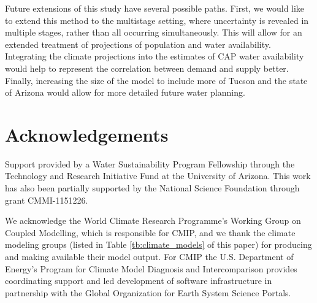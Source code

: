 \documentclass[opre,nonblindrev]{informs3} %
\begin{document}
Future extensions of this study have several possible paths.
First, we would like to extend this method to the multistage setting, where uncertainty is revealed in multiple stages, rather than all occurring simultaneously.
This will allow for an extended treatment of projections of population and water availability.
Integrating the climate projections into the estimates of CAP water availability would help to represent the correlation between demand and supply better.
Finally, increasing the size of the model to include more of Tucson and the state of Arizona would allow for more detailed future water planning.




%

\section*{Acknowledgements}
Support provided by a Water Sustainability Program Fellowship through the Technology and Research Initiative Fund at the University of Arizona.
This work has also been partially supported by the National Science Foundation through grant CMMI-1151226.

We acknowledge the World Climate Research Programme's Working Group on Coupled Modelling, which is responsible for CMIP, and we thank the climate modeling groups (listed in Table \ref{tb:climate_models} of this paper) for producing and making available their model output.
For CMIP the U.S. Department of Energy's Program for Climate Model Diagnosis and Intercomparison provides coordinating support and led development of software infrastructure in partnership with the Global Organization for Earth System Science Portals.


\end{document}

